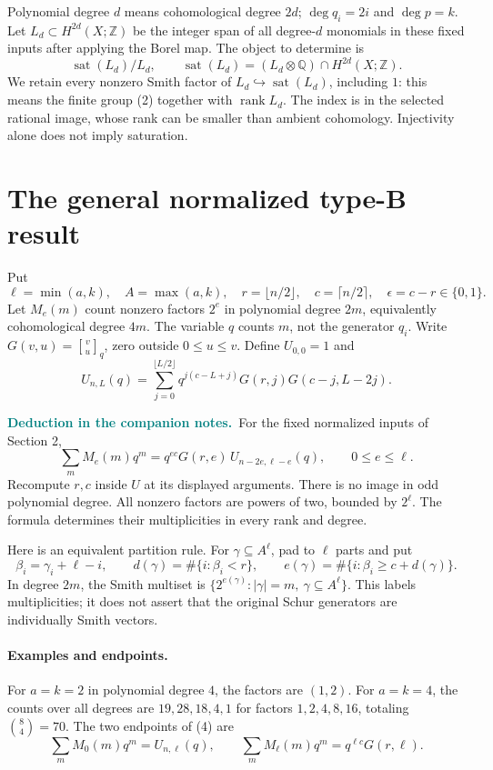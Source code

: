 \documentclass[11pt,letterpaper]{article}
\newcommand{\Z}{\mathbb Z}
\newcommand{\Q}{\mathbb Q}
\newcommand{\sat}{\operatorname{sat}}
\newcommand{\rank}{\operatorname{rank}}
\newcommand{\qbinom}[2]{\genfrac{[}{]}{0pt}{}{#1}{#2}_q}
\newcommand{\deduction}{\textcolor{teal}{\textbf{Deduction in the companion notes.}}\ }
\begin{document}
Polynomial degree \(d\) means cohomological degree \(2d\);
\(\deg q_i=2i\) and \(\deg p=k\).
Let \(L_d\subset H^{2d}(X;\Z)\) be the integer span of all degree-\(d\)
monomials in these fixed inputs after applying the Borel map. The object
to determine is
\[
 \sat(L_d)/L_d,\qquad
 \sat(L_d)=(L_d\otimes\Q)\cap H^{2d}(X;\Z).
 \tag{2}
\]
We retain every nonzero Smith factor of \(L_d\hookrightarrow\sat(L_d)\),
including \(1\): this means the finite group (2) together with \(\rank L_d\).
The index is in the selected rational image, whose rank can be smaller
than ambient cohomology. Injectivity alone does not imply saturation.


\newpage
\section{The general normalized type-B result}
Put
\[
 \ell=\min(a,k),\quad A=\max(a,k),\quad
 r=\lfloor n/2\rfloor,\quad c=\lceil n/2\rceil,\quad
 \epsilon=c-r\in\{0,1\}.
\]
Let \(M_e(m)\) count nonzero factors \(2^e\) in polynomial degree \(2m\),
equivalently cohomological degree \(4m\).
The variable \(q\) counts \(m\), not the generator \(q_i\).
Write \(G(v,u)=\qbinom{v}{u}\), zero outside \(0\le u\le v\).
Define \(U_{0,0}=1\) and
\[
 U_{n,L}(q)=
 \sum_{j=0}^{\lfloor L/2\rfloor}
 q^{j(c-L+j)}G(r,j)G(c-j,L-2j).
 \tag{3}
\]

\deduction For the fixed normalized inputs of Section 2,
\[
 \boxed{\quad
 \sum_m M_e(m)q^m
 =q^{ec}G(r,e)\,U_{n-2e,\ell-e}(q),
 \qquad 0\le e\le\ell .
 \quad} \tag{4}
\]
Recompute \(r,c\) inside \(U\) at its displayed arguments.
There is no image in odd polynomial degree.
All nonzero factors are powers of two, bounded by \(2^\ell\).
The formula determines their multiplicities in every rank and degree.

Here is an equivalent partition rule. For
\(\gamma\subseteq A^\ell\), pad to \(\ell\) parts and put
\[
 \beta_i=\gamma_i+\ell-i,\qquad
 d(\gamma)=\#\{i:\beta_i<r\},\qquad
 e(\gamma)=\#\{i:\beta_i\ge c+d(\gamma)\}.
 \tag{5}
\]
In degree \(2m\), the Smith multiset is
\(\{2^{e(\gamma)}:|\gamma|=m,\ \gamma\subseteq A^\ell\}\).
This labels multiplicities; it does not assert that the original Schur
generators are individually Smith vectors.

\paragraph{Examples and endpoints.}
For \(a=k=2\) in polynomial degree \(4\), the factors are \((1,2)\).
For \(a=k=4\), the counts over all degrees are \(19,28,18,4,1\)
for factors \(1,2,4,8,16\), totaling \(\binom84=70\).
The two endpoints of (4) are
\[
 \sum_m M_0(m)q^m=U_{n,\ell}(q),\qquad
 \sum_m M_\ell(m)q^m=q^{\ell c}G(r,\ell).
 \tag{6}
\]
\end{document}
